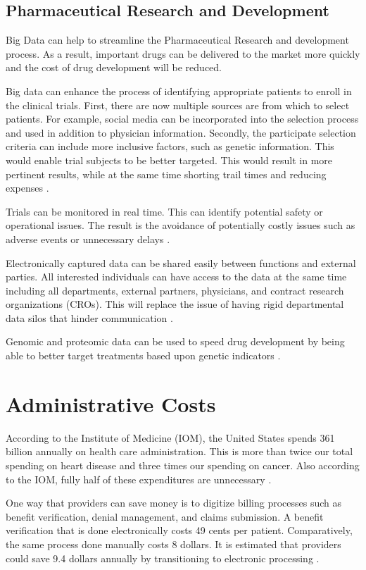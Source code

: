 \documentclass[sigconf]{acmart}
\begin{document}
\subsection{Pharmaceutical Research and Development}

Big Data can help to streamline the Pharmaceutical Research and development process. As a result, important drugs can be delivered to the market more quickly and the cost of drug development will be reduced.

Big data can enhance the process of identifying appropriate patients to enroll in the clinical trials. First, there are now multiple  sources are from which to select patients. For example, social media can be incorporated into the selection process and used in addition to physician information. Secondly, the participate selection criteria can include more inclusive factors, such as genetic information. This would enable trial subjects to be better targeted. This would result in more pertinent results, while at the same time shorting trail times and reducing expenses \cite{www-google-pharmrd}.

Trials can be monitored in real time. This can identify potential safety or operational issues. The result is the avoidance of potentially costly issues such as adverse events or unnecessary delays \cite{www-google-pharmrd}.

Electronically captured data can be shared easily between functions and external parties. All interested individuals can have access to the data at the same time including all departments, external partners, physicians, and contract research organizations (CROs). This will replace the issue of having rigid departmental data silos that hinder communication \cite{www-google-pharmrd}. 

Genomic and proteomic data can be used to speed drug development by being able to better target treatments based upon genetic indicators \cite{www-google-hadoop}.

\section{Administrative Costs}
According to the Institute of Medicine (IOM), the United States spends 361 billion annually on health care administration.  This is more than twice our total spending on heart disease and three times our spending on cancer. Also according to the IOM, fully half of these expenditures are unnecessary \cite{www-google-data}.

One way that providers can save money is to digitize billing processes such as benefit verification, denial management, and claims submission. A benefit verification that is done electronically costs 49 cents per patient.  Comparatively, the same process done manually costs 8 dollars.  It is estimated that providers could save 9.4 dollars annually by transitioning to electronic processing \cite{www-google-admin}. 
\end{document}
